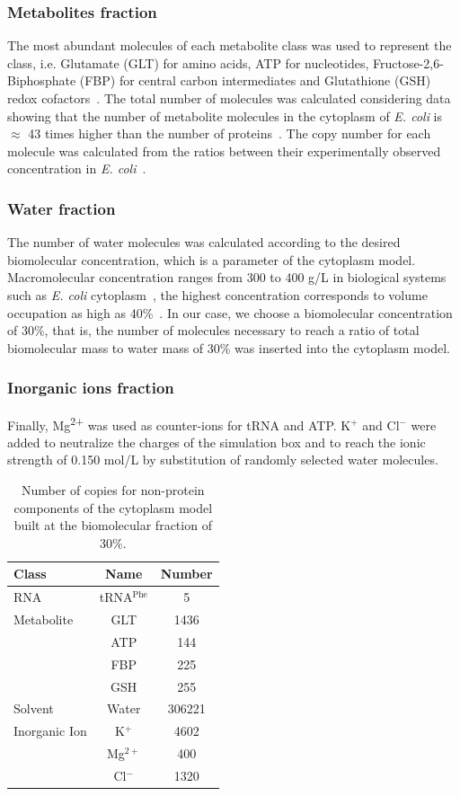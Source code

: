 \documentclass[journal=jcisd8,manuscript=article]{achemso}
\begin{document}
\subsubsection{Metabolites fraction}
The most abundant molecules of each metabolite class was used to 
represent the class, i.e. Glutamate (GLT) for amino acids, ATP for
nucleotides, Fructose-2,6-Biphosphate (FBP) for central carbon
intermediates and Glutathione (GSH) redox
cofactors~\cite{Bennett2009}. The total number of molecules was
calculated considering data showing that the number of metabolite
molecules in the cytoplasm of \textit{E. coli} is $\approx$ 43 times
higher than the number of proteins~\cite{Bennett2009}. The copy number
for each molecule was calculated from the ratios between their
experimentally observed concentration in {\em
  E. coli}~\cite{Bennett2009}.

\subsubsection{Water fraction}
The number of water molecules was calculated according to the desired
biomolecular concentration, which is a parameter of the cytoplasm
model. Macromolecular concentration ranges from 300 to 400 g/L in biological systems
such as \textit{E. coli} cytoplasm~\cite{Zimmerman1991}, the highest concentration corresponds to volume occupation as high as 40\%~\cite{Ellis2003a}. In our case, we
choose a biomolecular concentration of 30\%, that is, the number of
molecules necessary to reach a ratio of total biomolecular mass to
water mass of 30\% was inserted into the cytoplasm model.

\subsubsection{Inorganic ions fraction}
Finally, Mg\textsuperscript{2+} was used as counter-ions for tRNA and
ATP. K$^{+}$ and Cl$^{-}$ were added to neutralize the charges of the
simulation box and to reach the ionic strength of 0.150 mol/L by
substitution of randomly selected water molecules.



\begin{table}
\centering
\begin{tabular}{lcc}
\hline
Class & Name & Number\\
\hline
RNA & tRNA$^{\text{Phe}}$ & 5\\
\hline
Metabolite & GLT & 1436\\
  & ATP & 144\\
  & FBP & 225\\
  & GSH & 255\\
\hline
Solvent & Water & 306221\\
\hline
Inorganic Ion & K$^{+}$ & 4602\\
  & Mg$^{2+}$ & 400\\
  & Cl$^{-}$ & 1320\\
\hline
\end{tabular}
\caption{Number of copies for non-protein components of the cytoplasm model built at the biomolecular fraction of 30\%.}
\label{tbl:soup_components}
\end{table}
\end{document}

